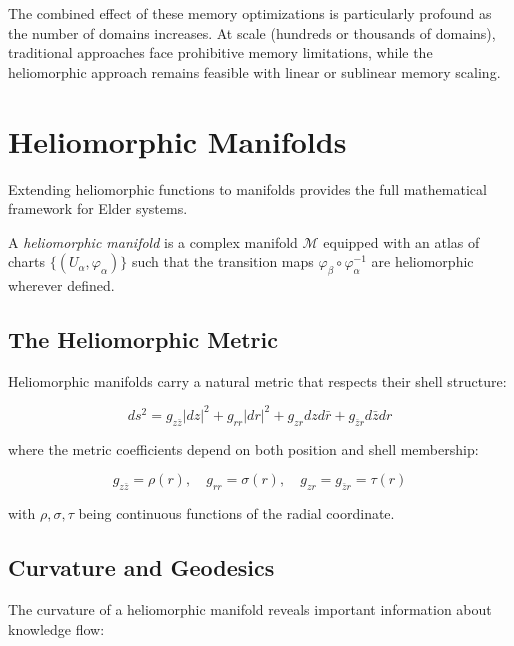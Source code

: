 The combined effect of these memory optimizations is particularly profound as the number of domains increases. At scale (hundreds or thousands of domains), traditional approaches face prohibitive memory limitations, while the heliomorphic approach remains feasible with linear or sublinear memory scaling.

\section{Heliomorphic Manifolds}

Extending heliomorphic functions to manifolds provides the full mathematical framework for Elder systems.

\begin{definition}
A \textit{heliomorphic manifold} is a complex manifold $\mathcal{M}$ equipped with an atlas of charts $\{(U_{\alpha}, \varphi_{\alpha})\}$ such that the transition maps $\varphi_{\beta} \circ \varphi_{\alpha}^{-1}$ are heliomorphic wherever defined.
\end{definition}

\subsection{The Heliomorphic Metric}

Heliomorphic manifolds carry a natural metric that respects their shell structure:

\begin{equation}
ds^2 = g_{z\bar{z}}|dz|^2 + g_{rr}|dr|^2 + g_{z r}dz d\bar{r} + g_{\bar{z}r}d\bar{z}dr
\end{equation}

where the metric coefficients depend on both position and shell membership:

\begin{equation}
g_{z\bar{z}} = \rho(r), \quad g_{rr} = \sigma(r), \quad g_{z r} = g_{\bar{z}r} = \tau(r)
\end{equation}

with $\rho, \sigma, \tau$ being continuous functions of the radial coordinate.

\subsection{Curvature and Geodesics}

The curvature of a heliomorphic manifold reveals important information about knowledge flow:

